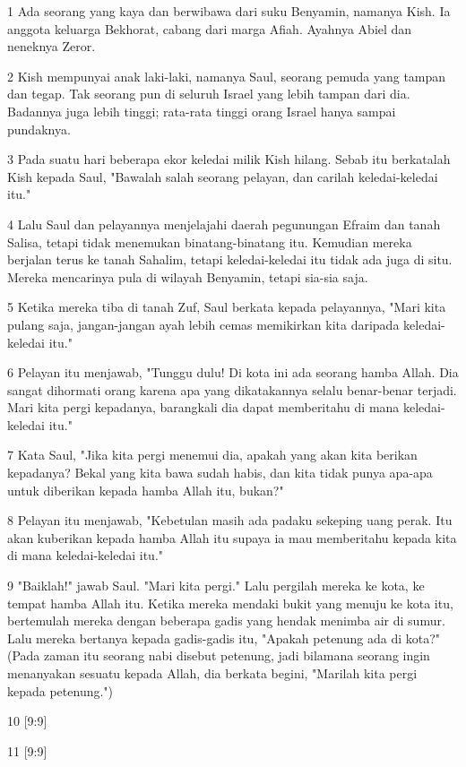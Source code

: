 \par 1 Ada seorang yang kaya dan berwibawa dari suku Benyamin, namanya Kish. Ia anggota keluarga Bekhorat, cabang dari marga Afiah. Ayahnya Abiel dan neneknya Zeror.
\par 2 Kish mempunyai anak laki-laki, namanya Saul, seorang pemuda yang tampan dan tegap. Tak seorang pun di seluruh Israel yang lebih tampan dari dia. Badannya juga lebih tinggi; rata-rata tinggi orang Israel hanya sampai pundaknya.
\par 3 Pada suatu hari beberapa ekor keledai milik Kish hilang. Sebab itu berkatalah Kish kepada Saul, "Bawalah salah seorang pelayan, dan carilah keledai-keledai itu."
\par 4 Lalu Saul dan pelayannya menjelajahi daerah pegunungan Efraim dan tanah Salisa, tetapi tidak menemukan binatang-binatang itu. Kemudian mereka berjalan terus ke tanah Sahalim, tetapi keledai-keledai itu tidak ada juga di situ. Mereka mencarinya pula di wilayah Benyamin, tetapi sia-sia saja.
\par 5 Ketika mereka tiba di tanah Zuf, Saul berkata kepada pelayannya, "Mari kita pulang saja, jangan-jangan ayah lebih cemas memikirkan kita daripada keledai-keledai itu."
\par 6 Pelayan itu menjawab, "Tunggu dulu! Di kota ini ada seorang hamba Allah. Dia sangat dihormati orang karena apa yang dikatakannya selalu benar-benar terjadi. Mari kita pergi kepadanya, barangkali dia dapat memberitahu di mana keledai-keledai itu."
\par 7 Kata Saul, "Jika kita pergi menemui dia, apakah yang akan kita berikan kepadanya? Bekal yang kita bawa sudah habis, dan kita tidak punya apa-apa untuk diberikan kepada hamba Allah itu, bukan?"
\par 8 Pelayan itu menjawab, "Kebetulan masih ada padaku sekeping uang perak. Itu akan kuberikan kepada hamba Allah itu supaya ia mau memberitahu kepada kita di mana keledai-keledai itu."
\par 9 "Baiklah!" jawab Saul. "Mari kita pergi." Lalu pergilah mereka ke kota, ke tempat hamba Allah itu. Ketika mereka mendaki bukit yang menuju ke kota itu, bertemulah mereka dengan beberapa gadis yang hendak menimba air di sumur. Lalu mereka bertanya kepada gadis-gadis itu, "Apakah petenung ada di kota?" (Pada zaman itu seorang nabi disebut petenung, jadi bilamana seorang ingin menanyakan sesuatu kepada Allah, dia berkata begini, "Marilah kita pergi kepada petenung.")
\par 10 [9:9]
\par 11 [9:9]
